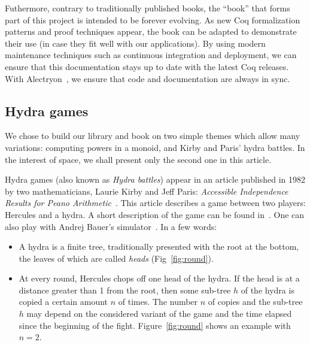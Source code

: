 \documentclass{easychair}
\newcommand{\coq}{Coq\xspace}
\newcommand{\alectr}{Alectryon\xspace}
\begin{document}
Futhermore, contrary to traditionally published books, the ``book'' that forms part of this project is intended to be forever evolving. As new \coq formalization patterns and proof techniques appear, the book can be adapted to demonstrate their use (in case they fit well with our applications).
%
By using modern maintenance techniques such as continuous integration and deployment, we can ensure that this documentation stays up to date with the latest \coq releases. With \alectr~\cite{alectryonpaper, alectryongithub}, we ensure that code and documentation are always in sync.

\subsection{Hydra games}

We chose to build our library and book on two simple themes which allow many variations: computing powers in a monoid, and Kirby and Paris' hydra battles. In the interest of space, we shall present only the second one in this article.


Hydra games (also known as \emph{Hydra battles}) appear in an article published in 1982 by two mathematicians, 
Laurie Kirby and Jeff Paris: \emph{Accessible Independence Results for Peano Arithmetic}~\cite{KP82}.
This article describes a game between two players: Hercules and a hydra.
A short description of the game  can be found in~\cite{bauer2008, KP82, JFLA2018paper}. One can also play with
Andrej Bauer's simulator~\cite{BauerHydra}.
In a few words:
\begin{itemize}
\item A hydra is a finite tree, traditionally presented with the root at the bottom, the leaves of which are called \emph{heads}
  (Fig~\ref{fig:round}).
\item At every round, Hercules chops off one head of the hydra. If the head is at a distance greater than 1 from the root,
  then some sub-tree $h$ of the hydra is copied a certain amount $n$ of times. The number $n$ of copies and the sub-tree $h$ may depend on the considered variant of the game
  and the time elapsed since the beginning of the fight.
  Figure~\ref{fig:round} shows an example with $n=2$.
\end{itemize}
\end{document}
